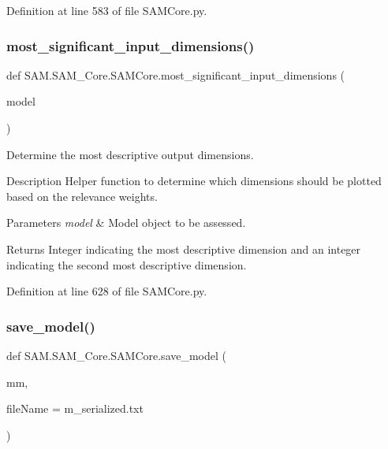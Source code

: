 Definition at line 583 of file S\+A\+M\+Core.\+py.

\mbox{\label{group__icubclient__SAM__Core_ga28b70c1cda2c0787dd3728b4e39a55a1}} 
\subsubsection{\texorpdfstring{most\+\_\+significant\+\_\+input\+\_\+dimensions()}{most\_significant\_input\_dimensions()}}
{\footnotesize\ttfamily def S\+A\+M.\+S\+A\+M\+\_\+\+Core.\+S\+A\+M\+Core.\+most\+\_\+significant\+\_\+input\+\_\+dimensions (\begin{DoxyParamCaption}\item[{}]{model }\end{DoxyParamCaption})}



Determine the most descriptive output dimensions. 

\begin{DoxyParagraph}{Description}
Helper function to determine which dimensions should be plotted based on the relevance weights.
\end{DoxyParagraph}

\begin{DoxyParams}{Parameters}
{\em model} & Model object to be assessed.\\
\hline
\end{DoxyParams}
\begin{DoxyReturn}{Returns}
Integer indicating the most descriptive dimension and an integer indicating the second most descriptive dimension. 
\end{DoxyReturn}


Definition at line 628 of file S\+A\+M\+Core.\+py.

\mbox{\label{group__icubclient__SAM__Core_ga9ce969892128bc69c859146c6ba19b47}} 
\subsubsection{\texorpdfstring{save\+\_\+model()}{save\_model()}}
{\footnotesize\ttfamily def S\+A\+M.\+S\+A\+M\+\_\+\+Core.\+S\+A\+M\+Core.\+save\+\_\+model (\begin{DoxyParamCaption}\item[{}]{mm,  }\item[{}]{file\+Name = {\ttfamily \textquotesingle{}m\+\_\+serialized.txt\textquotesingle{}} }\end{DoxyParamCaption})}



